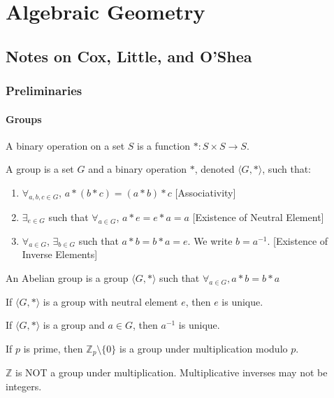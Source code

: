 \documentclass[crop=false,class=book]{standalone}
\begin{document}
\chapter{Algebraic Geometry}
\section{Notes on Cox, Little, and O'Shea}
\subsection{Preliminaries}
\subsubsection{Groups}
\begin{definition}
A binary operation on a set $S$ is a function $*:S\times S \rightarrow S$.
\end{definition}
\begin{definition}
A group is a set $G$ and a binary operation $*$, denoted $\langle G,*\rangle$, such that:
\begin{enumerate}
    \item $\forall_{a,b,c\in G}$, $a*(b*c) = (a*b)*c$ \hfill [Associativity]
    \item $\exists_{e\in G}$ such that $\forall_{a\in G}$, $a*e=e*a = a$ \hfill [Existence of Neutral Element]
    \item $\forall_{a\in G}$, $\exists_{b\in G}$ such that $a*b = b*a = e$. We write $b=a^{-1}$. \hfill [Existence of Inverse Elements]
\end{enumerate}
\end{definition}
\begin{definition}
An Abelian group is a group $\langle G,*\rangle$ such that $\forall_{a\in G},a*b=b*a$
\end{definition}
\begin{theorem}
If $\langle G, *\rangle$ is a group with neutral element $e$, then $e$ is unique.
\end{theorem}
\begin{theorem}
If $\langle G,*\rangle$ is a group and $a\in G$, then $a^{-1}$ is unique.
\end{theorem}
\begin{theorem}
If $p$ is prime, then $\mathbb{Z}_p\setminus \{0\}$ is a group under multiplication modulo $p$.
\end{theorem}
\begin{remark}
$\mathbb{Z}$ is NOT a group under multiplication. Multiplicative inverses may not be integers.
\end{remark}
\end{document}
